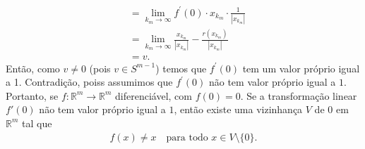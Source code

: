 \begin{homeworkProblem}[Seção 1-9]
\begin{solution}
\begin{align*}
      &=\lim_{k_m \to \infty}f^{\prime}(0)\cdot x_{k_m}\cdot \frac{1}{|x_{k_m}|}\\
      &=\lim_{k_m \to \infty}\frac{x_{k_m}}{|x_{k_m}|}-\frac{r(x_{k_m})}{|x_{k_m}|}\\
      &=v.
    \end{align*}
    Então, como $v\neq 0$ (pois $v\in S^{m-1}$) temos que $f^{\prime}(0)$ tem um valor próprio igual a 1. Contradição, poiss assumimos que $f^{\prime}(0)$ não tem valor próprio igual a $1$. Portanto, se $f : \mathbb{R}^m \to \mathbb{R}^m$ diferenciável, com $f(0)=0$. Se a transformação linear $f'(0)$ não tem valor próprio igual a $1$, então existe uma vizinhança $V$ de $0$ em $\mathbb{R}^m$ tal que
    \begin{align*}
      f(x) \neq x \quad \text{para todo } x \in V \setminus \{0\}.   
    \end{align*} 
  \end{solution}
\end{homeworkProblem}
